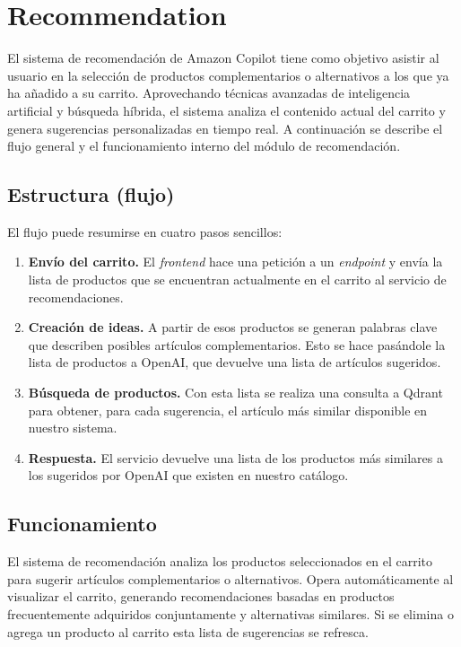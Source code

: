 \section{Recommendation}
El sistema de recomendación de Amazon Copilot tiene como objetivo asistir al usuario en la selección de productos complementarios o alternativos a los que ya ha añadido a su carrito. Aprovechando técnicas avanzadas de inteligencia artificial y búsqueda híbrida, el sistema analiza el contenido actual del carrito y genera sugerencias personalizadas en tiempo real. A continuación se describe el flujo general y el funcionamiento interno del módulo de recomendación.

\subsection{Estructura (flujo)}

El flujo puede resumirse en cuatro pasos sencillos:

\begin{enumerate}
    \item \textbf{Envío del carrito.} El \textit{frontend} hace una petición a un \textit{endpoint} y envía la lista de productos que se encuentran actualmente en el carrito al servicio de recomendaciones.
    \item \textbf{Creación de ideas.} A partir de esos productos se generan palabras clave que describen posibles artículos complementarios. Esto se hace pasándole la lista de productos a OpenAI, que devuelve una lista de artículos sugeridos.
    \item \textbf{Búsqueda de productos.} Con esta lista se realiza una consulta a Qdrant para obtener, para cada sugerencia, el artículo más similar disponible en nuestro sistema.
    \item \textbf{Respuesta.} El servicio devuelve una lista de los productos más similares a los sugeridos por OpenAI que existen en nuestro catálogo.
\end{enumerate}

\subsection{Funcionamiento}

El sistema de recomendación analiza los productos seleccionados en el carrito para sugerir artículos complementarios o alternativos. Opera automáticamente al visualizar el carrito, generando recomendaciones basadas en productos frecuentemente adquiridos conjuntamente y alternativas similares. Si se elimina o agrega un producto al carrito esta lista de sugerencias se refresca.
